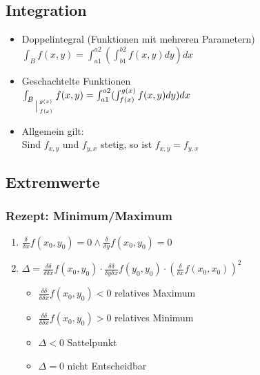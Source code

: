 \subsection{Integration}
\begin{itemize}
	\item Doppelintegral (Funktionen mit mehreren Parametern) \\
	$\int_B f(x, y) = \int_{a1}^{a2}(\int_{b1}^{b2} f(x, y) dy) dx$

	\item Geschachtelte Funktionen \\
	$\int_{B_{\big\arrowvert_{f(x)}^{g(x)}}} f(x, y) = \int_{a1}^{a2}(\int_{f(x)}^{g(x)} f(x, y) dy) dx$

	\item Allgemein gilt: \\
	Sind $f_{x,y}$ und $f_{y,x}$ stetig, so ist $f_{x,y} = f_{y,x}$
\end{itemize}

\subsection{Extremwerte}
\subsubsection{Rezept: Minimum/Maximum}
\begin{enumerate}
	\item $\frac{\delta}{\delta x}f(x_0,y_0) = 0 \wedge \frac{\delta}{\delta y}f(x_0,y_0) = 0$

	\item $\Delta = \frac{\delta \delta}{\delta \delta x}f(x_0,y_0) \cdot \frac{\delta \delta}{\delta y \delta x}f(y_0,y_0) \cdot (\frac{\delta}{\delta x}f(x_0,x_0))^2$
	\begin{itemize}
		\item $\frac{\delta \delta}{\delta \delta x}f(x_0,y_0) < 0$ relatives Maximum
		\item $\frac{\delta \delta}{\delta \delta x}f(x_0,y_0) > 0$ relatives Minimum
		\item $\Delta < 0$ Sattelpunkt
		\item $\Delta = 0$ nicht Entscheidbar
	\end{itemize}
\end{enumerate}
